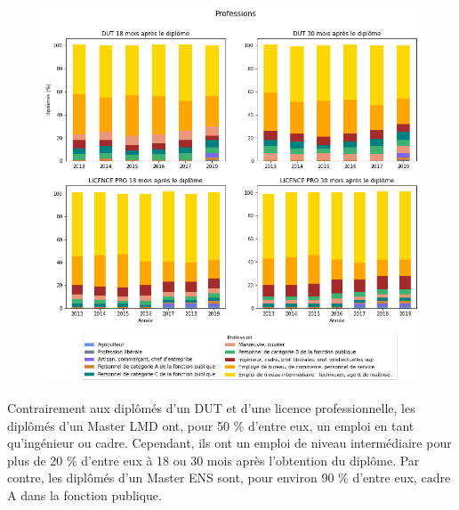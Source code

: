 \documentclass[12pt, a4paper, titlepage, table]{article}
\begin{document}
		\begin{figure}[H]
			\centering
			\includegraphics[width=1\textwidth]{../graphs/repartition_professions_situation_1.png}
			\label{fig:profession_pourcentage_1}
		\end{figure}
	
	Contrairement aux diplômés d'un DUT et d'une licence professionnelle, les diplômés d'un Master LMD ont, pour 50 \% d'entre eux, un emploi en tant qu'ingénieur ou cadre.
	Cependant, ils ont un emploi de niveau intermédiaire pour plus de 20 \% d'entre eux à 18 ou 30 mois après l'obtention du diplôme.
	Par contre, les diplômés d'un Master ENS sont, pour environ 90 \% d'entre eux, cadre A dans la fonction publique.
	
\end{document}
